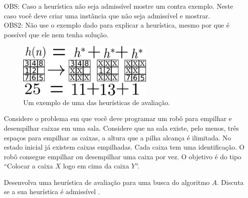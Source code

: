 \documentclass[12pt]{exam}
\begin{document}
\begin{questions}
OBS: Caso a heurística não seja admissível mostre um contra exemplo. Neste caso você deve criar uma instância que não seja admissível e mostrar.\\
OBS2: Não use o exemplo dado para explicar a heurística, mesmo por que é possível que ele nem tenha solução.



\begin{figure}[h]
    \centering
    \includegraphics[width=0.60\textwidth]{8p3heu}
    \caption{Um exemplo de uma das heurísticas de avaliação.}
    \label{fig:8p3heu}
\end{figure}


\item Considere o problema em que você deve programar um robô para empilhar e desempilhar caixas em uma sala. Considere que na sala existe, pelo menos, três espaços para empilhar as caixas, a altura que a pilha alcança é ilimitada. No estado inicial já existem caixas empilhadas. Cada caixa tem uma identificação. O robô consegue empilhar ou desempilhar uma caixa por vez. O objetivo é do tipo ``Colocar a caixa $X$ logo em cima da caixa $Y$''.

Desenvolva uma heurística de avaliação para uma busca do algoritmo $A$. Discuta se a sua heurística é admissível
.


\end{questions}
\end{document}
